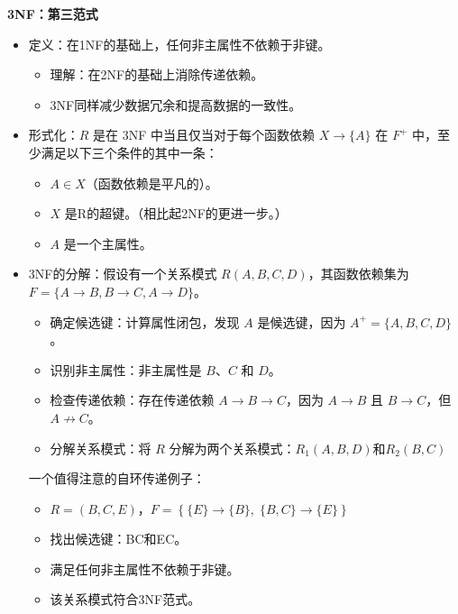 \documentclass[b5paper, twoside]{article}
\let\oldtextbf\textbf
\renewcommand{\textbf}[1]{\textcolor{myblue}{\oldtextbf{#1}}}
\newenvironment{smallmdframed}
  {\begin{mdframed}[linewidth=0pt, backgroundcolor=pink!20]\small}
  {\end{mdframed}}
\begin{document}
\textbf{3NF：第三范式}
\begin{itemize}
    \item 定义：在1NF的基础上，任何非主属性不依赖于非键。
    \begin{itemize}
        \item 理解：在2NF的基础上消除传递依赖。
        \item 3NF同样减少数据冗余和提高数据的一致性。
    \end{itemize}
    \item 形式化：$R$ 是在 3NF 中当且仅当对于每个函数依赖 $X \rightarrow \{A\}$ 在 $F^+$ 中，至少满足以下三个条件的其中一条：
    \begin{itemize}
        \item $A \in X$（函数依赖是平凡的）。
        \item $X$ 是R的超键。（相比起2NF的更进一步。）
        \item $A$ 是一个主属性。
    \end{itemize}
    \item 3NF的分解：假设有一个关系模式 \( R(A, B, C, D) \)，其函数依赖集为 \( F = \{A \rightarrow B, B \rightarrow C, A \rightarrow D\} \)。
    \begin{itemize}
        \item {确定候选键}：计算属性闭包，发现 \( A \) 是候选键，因为 \( A^+ = \{A, B, C, D\} \)。
        \item {识别非主属性}：非主属性是 \( B \)、\( C \) 和 \( D \)。
        \item {检查传递依赖}：存在传递依赖 \( A \rightarrow B \rightarrow C \)，因为 \( A \rightarrow B \) 且 \( B \rightarrow C \)，但 \( A \not\rightarrow C \)。
        \item {分解关系模式}：将 \( R \) 分解为两个关系模式：\( R_1(A, B, D) \)和\( R_2(B, C) \)
    \end{itemize}
\begin{smallmdframed}
    一个值得注意的自环传递例子：
    \begin{itemize}
        \item $R=(B,C,E)$，$F = \left\{ \{{E}\} \to \{{B}\}, \; \{{B,C}\} \to \{{E}\} \right\}$
        \item 找出候选键：BC和EC。
        \item 满足任何非主属性不依赖于非键。
        \item 该关系模式符合3NF范式。
    \end{itemize}
\end{smallmdframed}
\end{itemize}
\end{document}
